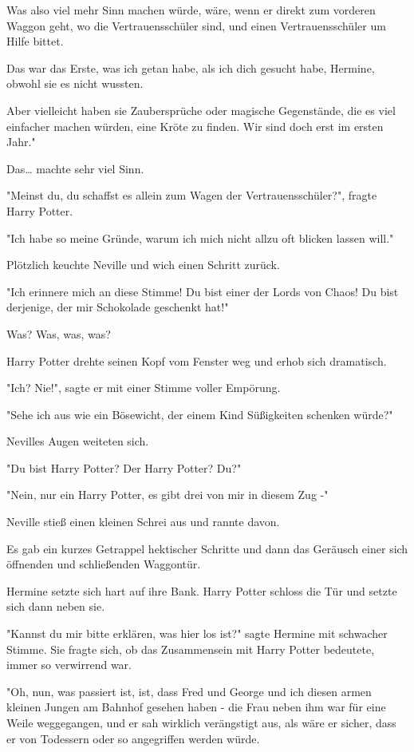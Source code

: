 {Was also viel mehr Sinn machen würde, wäre, wenn er direkt zum vorderen Waggon geht, wo die Vertrauensschüler sind, und einen Vertrauensschüler um Hilfe bittet.

Das war das Erste, was ich getan habe, als ich dich gesucht habe, Hermine, obwohl sie es nicht wussten.

Aber vielleicht haben sie Zaubersprüche oder magische Gegenstände, die es viel einfacher machen würden, eine Kröte zu finden. Wir sind doch erst im ersten Jahr."

Das… machte sehr viel Sinn.

"Meinst du, du schaffst es allein zum Wagen der Vertrauensschüler?", fragte Harry Potter.

"Ich habe so meine Gründe, warum ich mich nicht allzu oft blicken lassen will."

Plötzlich keuchte Neville und wich einen Schritt zurück.

"Ich erinnere mich an diese Stimme! Du bist einer der Lords von Chaos! Du bist derjenige, der mir Schokolade geschenkt hat!"

Was? Was, was, was?

Harry Potter drehte seinen Kopf vom Fenster weg und erhob sich dramatisch.

"Ich? Nie!", sagte er mit einer Stimme voller Empörung.

"Sehe ich aus wie ein Bösewicht, der einem Kind Süßigkeiten schenken würde?"

Nevilles Augen weiteten sich.

"Du bist Harry Potter? Der Harry Potter? Du?"

"Nein, nur ein Harry Potter, es gibt drei von mir in diesem Zug -"

Neville stieß einen kleinen Schrei aus und rannte davon.

Es gab ein kurzes Getrappel hektischer Schritte und dann das Geräusch einer sich öffnenden und schließenden Waggontür.

Hermine setzte sich hart auf ihre Bank. Harry Potter schloss die Tür und setzte sich dann neben sie.

"Kannst du mir bitte erklären, was hier los ist?" sagte Hermine mit schwacher Stimme. Sie fragte sich, ob das Zusammensein mit Harry Potter bedeutete, immer so verwirrend war.

"Oh, nun, was passiert ist, ist, dass Fred und George und ich diesen armen kleinen Jungen am Bahnhof gesehen haben - die Frau neben ihm war für eine Weile weggegangen, und er sah wirklich verängstigt aus, als wäre er sicher, dass er von Todessern oder so angegriffen werden würde.

}
